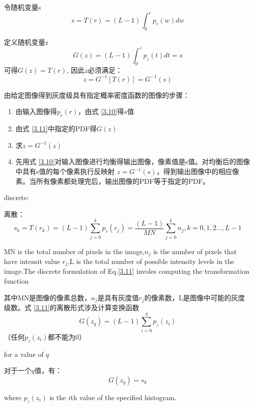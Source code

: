 \documentclass[12pt]{article}
\numberwithin{equation}{section}%
\begin{document}
令随机变量s
\begin{equation} \label{3.10}  
 s=T(r)=(L-1)\int_{0}^{r}p_{r}(w)dw 
\end{equation}

定义随机变量z
\begin{equation} \label{3.11}   
 G(z)=(L-1)\int_{0}^{z}p_{z}(t)dt=s 
\end{equation}
可得$G(z)=T(r)$, 因此$z$必须满足：
\begin{equation} \label{3.12}   
 z=G^{-1}[T(r)]=G^{-1}(s)
\end{equation}

由给定图像得到灰度级具有指定概率密度函数的图像的步骤：
\begin{enumerate}
\item 由输入图像得$p_{r}(r)$，由式 \ref{3.10}得$s$值
\item 由式 \ref{3.11}中指定的PDF得$G(z)$
\item 求$z=G^{-1}(z)$
\item 先用式 \ref{3.10}对输入图像进行均衡得输出图像，像素值是s值。对均衡后的图像中具有s值的每个像素执行反映射 $z=G^{-1}(s)$，得到输出图像中的相应像素。当所有像素都处理完后，输出图像的PDF等于指定的PDF。
\end{enumerate}

discrete:

离散：
\begin{equation} \label {3.13}
s_{k}=T(r_{k})=(L-1)\sum_{j=0}^{k}p_{r}(r_{j})=\frac{(L-1)}{MN}\sum_{j=0}^{k}{n_{j}},k=0,1,2\ldots,L-1
\end{equation}

MN is the total number of pixels in the image,$n_{j}$ is the number of pixels that have intensit value $r_{j}$,L is the total number of possible intensity levels in the image.The discrete formulation of Eq.\ref{3.11} involes computing the transformation function

其中MN是图像的像素总数，$n_{j}$是具有灰度值$r_{j}$的像素数，L是图像中可能的灰度级数。式 \ref{3.11}的离散形式涉及计算变换函数
\begin{equation} \label {3.14}
G(z_{q})=(L-1)\sum_{i=0}^{q}p_{z}(z_{i})
\end{equation}
（任何$p_{z}(z_{i})$都不能为0）

for a value of $q$

对于一个$q$值，有：
\begin{equation} \label {3.15}
G(z_{q})=s_{k}
\end{equation}

where $p_z(z_{i})$ is the $i$th value of the specified histogram.
\end{document}
